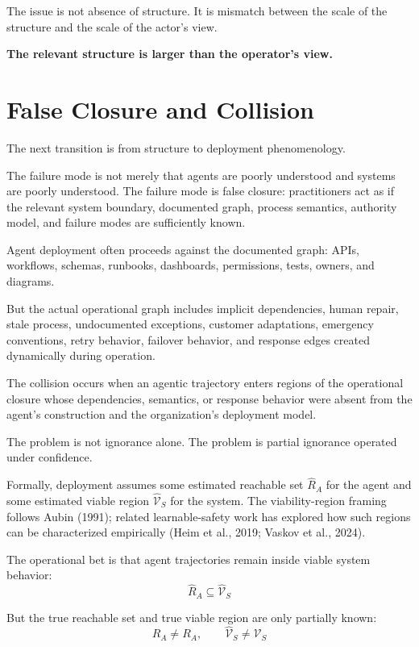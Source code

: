 \documentclass[11pt]{article}
\begin{document}
The issue is not absence of structure. It is mismatch between the scale of the structure and the scale of the actor's view.

\begin{pullquote}
\textbf{The relevant structure is larger than the operator's view.}
\end{pullquote}

\section{False Closure and Collision}

The next transition is from structure to deployment phenomenology.

The failure mode is not merely that agents are poorly understood and systems are poorly understood. The failure mode is false closure: practitioners act as if the relevant system boundary, documented graph, process semantics, authority model, and failure modes are sufficiently known.

Agent deployment often proceeds against the documented graph: APIs, workflows, schemas, runbooks, dashboards, permissions, tests, owners, and diagrams.

But the actual operational graph includes implicit dependencies, human repair, stale process, undocumented exceptions, customer adaptations, emergency conventions, retry behavior, failover behavior, and response edges created dynamically during operation.

The collision occurs when an agentic trajectory enters regions of the operational closure whose dependencies, semantics, or response behavior were absent from the agent's construction and the organization's deployment model.

The problem is not ignorance alone. The problem is partial ignorance operated under confidence.

Formally, deployment assumes some estimated reachable set $\widehat{R}_A$ for the agent and some estimated viable region $\widehat{\mathcal{V}}_S$ for the system. The viability-region framing follows Aubin (1991); related learnable-safety work has explored how such regions can be characterized empirically (Heim et al., 2019; Vaskov et al., 2024).

The operational bet is that agent trajectories remain inside viable system behavior:
\[
\widehat{R}_A \subseteq \widehat{\mathcal{V}}_S
\]

But the true reachable set and true viable region are only partially known:
\[
\widehat{R}_A \ne R_A,\qquad \widehat{\mathcal{V}}_S \ne \mathcal{V}_S
\]
\end{document}
